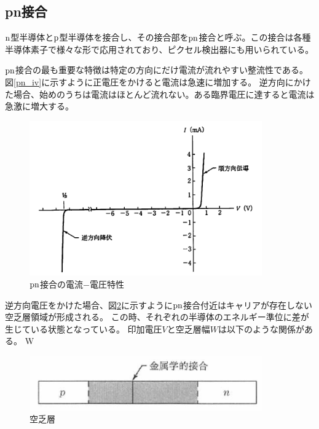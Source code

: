 \subsection{pn接合}
$\rm{n}$型半導体と$\rm{p}$型半導体を接合し、その接合部を$\rm{pn}$接合と呼ぶ。この接合は各種半導体素子で様々な形で応用されており、ピクセル検出器にも用いられている。

$\rm{pn}$接合の最も重要な特徴は特定の方向にだけ電流が流れやすい整流性である。図\ref{pn_iv}に示すように正電圧をかけると電流は急速に増加する。
逆方向にかけた場合、始めのうちは電流はほとんど流れない。ある臨界電圧に達すると電流は急激に増大する。

\begin{figure}[bpt]\centering
\includegraphics[width=10cm]{pn_iv}
\caption[$\rm{pn}$接合の電流$-$電圧特性]{$\rm{pn}$接合の電流$-$電圧特性\cite{2-1}}
\label{pure_silicon}
\end{figure}

逆方向電圧をかけた場合、図\ref{depletion_field}に示すように$\rm{pn}$接合付近はキャリアが存在しない空乏層領域が形成される。
この時、それぞれの半導体のエネルギー準位に差が生じている状態となっている。
印加電圧$V$と空乏層幅$W$は以下のような関係がある。
\bbb
W \propto {}
\eee

\begin{figure}[bpt]\centering
\includegraphics[width=10cm]{depletion_field}
\caption[空乏層]{空乏層\cite{2-1}}
\label{depletion_field}
\end{figure}

